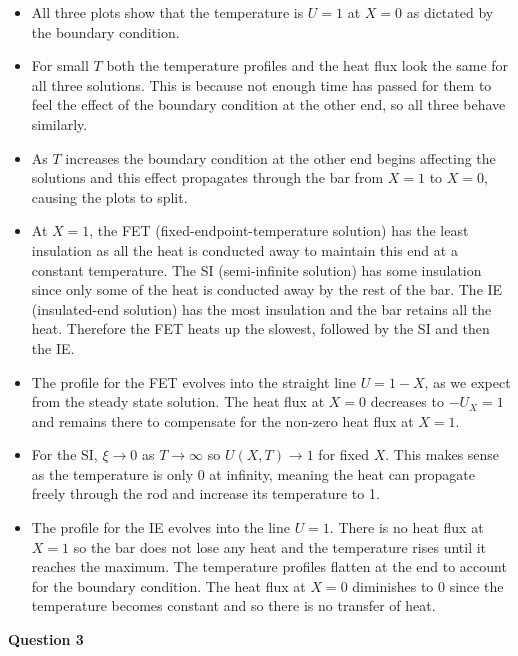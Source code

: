 \documentclass[12pt]{extarticle}
\begin{document}
\begin{itemize}
\item All three plots show that the temperature is $U=1$ at $X=0$ as dictated by the boundary condition.

\item For small $T$ both the temperature profiles and the heat flux look the same for all three solutions. This is because not enough time has passed for them to feel the effect of the boundary condition at the other end, so all three behave similarly. 

\item As $T$ increases the boundary condition at the other end begins affecting the solutions and this effect propagates through the bar from $X=1$ to $X=0$, causing the plots to split.

\item At $X=1$, the FET (fixed-endpoint-temperature solution) has the least insulation as all the heat is conducted away to maintain this end at a constant temperature. The SI (semi-infinite solution) has some insulation since only some of the heat is conducted away by the rest of the bar. The IE (insulated-end solution) has the most insulation and the bar retains all the heat. Therefore the FET heats up the slowest, followed by the SI and then the IE.

\item The profile for the FET evolves into the straight line $U = 1-X$, as we expect from the steady state solution. The heat flux at $X=0$ decreases to $-U_X=1$ and remains there to compensate for the non-zero heat flux at $X=1$. 

\item For the SI, $\xi \rightarrow 0$ as $T \rightarrow \infty$ so $U(X,T) \rightarrow 1$ for fixed $X$. This makes sense as the temperature is only 0 at infinity, meaning the heat can propagate freely through the rod and increase its temperature to 1.

\item The profile for the IE evolves into the line $U=1$. There is no heat flux at $X=1$ so the bar does not lose any heat and the temperature rises until it reaches the maximum. The temperature profiles flatten at the end to account for the boundary condition. The heat flux at $X=0$ diminishes to 0 since the temperature becomes constant and so there is no transfer of heat.
\end{itemize}

\begin{center}
\textbf{Question 3}
\end{center}
\end{document}
